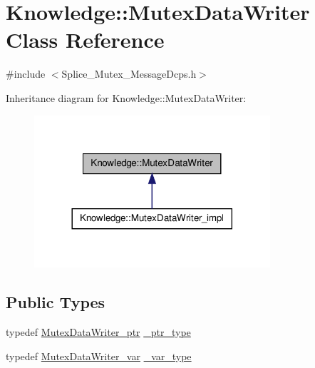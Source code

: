 \hypertarget{classKnowledge_1_1MutexDataWriter}{
\section{Knowledge::MutexDataWriter Class Reference}
\label{d7/dc9/classKnowledge_1_1MutexDataWriter}
}


{\ttfamily \#include $<$Splice\_\-Mutex\_\-MessageDcps.h$>$}



Inheritance diagram for Knowledge::MutexDataWriter:
\nopagebreak
\begin{figure}[H]
\begin{center}
\leavevmode
\includegraphics[width=248pt]{dd/d1a/classKnowledge_1_1MutexDataWriter__inherit__graph}
\end{center}
\end{figure}
\subsection*{Public Types}
\begin{DoxyCompactItemize}
\item 
typedef \hyperlink{classKnowledge_1_1MutexDataWriter}{MutexDataWriter\_\-ptr} \hyperlink{classKnowledge_1_1MutexDataWriter_a3770228b7ac3f52d1d49afe8d016bead}{\_\-ptr\_\-type}
\item 
typedef \hyperlink{namespaceKnowledge_a6883244ee070735ab1d7ad34821094fd}{MutexDataWriter\_\-var} \hyperlink{classKnowledge_1_1MutexDataWriter_a71f41386a05e03eb544638b42e64cddf}{\_\-var\_\-type}
\end{DoxyCompactItemize}
